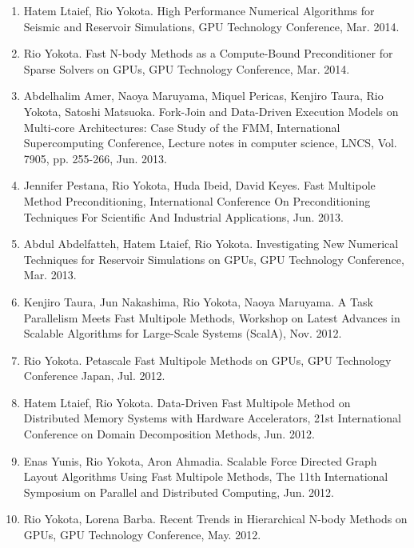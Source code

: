 \documentclass[margin,line]{cv}
\begin{document}
\begin{resume}
\begin{enumerate}
\item Hatem Ltaief, Rio Yokota. High Performance Numerical Algorithms for Seismic and Reservoir Simulations, GPU Technology Conference, Mar. 2014.

\item Rio Yokota. Fast N-body Methods as a Compute-Bound Preconditioner for Sparse Solvers on GPUs, GPU Technology Conference, Mar. 2014.

\item Abdelhalim Amer, Naoya Maruyama, Miquel Pericas, Kenjiro Taura, Rio Yokota, Satoshi Matsuoka. Fork-Join and Data-Driven Execution Models on Multi-core Architectures: Case Study of the FMM, International Supercomputing Conference, Lecture notes in computer science, LNCS, Vol. 7905, pp. 255-266, Jun. 2013.

\item Jennifer Pestana, Rio Yokota, Huda Ibeid, David Keyes. Fast Multipole Method Preconditioning, International Conference On Preconditioning Techniques For Scientific And Industrial Applications, Jun. 2013.

\item Abdul Abdelfatteh, Hatem Ltaief, Rio Yokota. Investigating New Numerical Techniques for Reservoir Simulations on GPUs, GPU Technology Conference, Mar. 2013.

\item Kenjiro Taura, Jun Nakashima, Rio Yokota, Naoya Maruyama. A Task Parallelism Meets Fast Multipole Methods, Workshop on Latest Advances in Scalable Algorithms for Large-Scale Systems (ScalA), Nov. 2012.

\item Rio Yokota. Petascale Fast Multipole Methods on GPUs, GPU Technology Conference Japan, Jul. 2012.

\item Hatem Ltaief, Rio Yokota. Data-Driven Fast Multipole Method on Distributed Memory Systems with Hardware Accelerators, 21st International Conference on Domain Decomposition Methods, Jun. 2012.

\item Enas Yunis, Rio Yokota, Aron Ahmadia. Scalable Force Directed Graph Layout Algorithms Using Fast Multipole Methods, The 11th International Symposium on Parallel and Distributed Computing, Jun. 2012.

\item Rio Yokota, Lorena Barba. Recent Trends in Hierarchical N-body Methods on GPUs, GPU Technology Conference, May. 2012.


\end{enumerate}
\end{resume}
\end{document}

